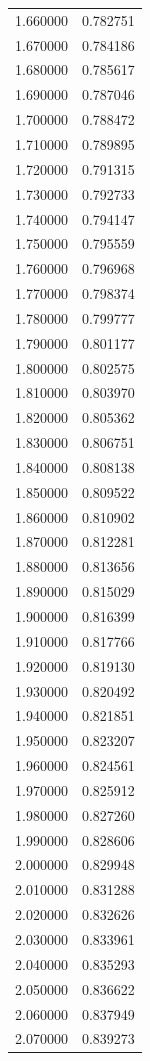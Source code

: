 \begin{tabular}{rr}
1.660000 & 0.782751 \\
1.670000 & 0.784186 \\
1.680000 & 0.785617 \\
1.690000 & 0.787046 \\
1.700000 & 0.788472 \\
1.710000 & 0.789895 \\
1.720000 & 0.791315 \\
1.730000 & 0.792733 \\
1.740000 & 0.794147 \\
1.750000 & 0.795559 \\
1.760000 & 0.796968 \\
1.770000 & 0.798374 \\
1.780000 & 0.799777 \\
1.790000 & 0.801177 \\
1.800000 & 0.802575 \\
1.810000 & 0.803970 \\
1.820000 & 0.805362 \\
1.830000 & 0.806751 \\
1.840000 & 0.808138 \\
1.850000 & 0.809522 \\
1.860000 & 0.810902 \\
1.870000 & 0.812281 \\
1.880000 & 0.813656 \\
1.890000 & 0.815029 \\
1.900000 & 0.816399 \\
1.910000 & 0.817766 \\
1.920000 & 0.819130 \\
1.930000 & 0.820492 \\
1.940000 & 0.821851 \\
1.950000 & 0.823207 \\
1.960000 & 0.824561 \\
1.970000 & 0.825912 \\
1.980000 & 0.827260 \\
1.990000 & 0.828606 \\
2.000000 & 0.829948 \\
2.010000 & 0.831288 \\
2.020000 & 0.832626 \\
2.030000 & 0.833961 \\
2.040000 & 0.835293 \\
2.050000 & 0.836622 \\
2.060000 & 0.837949 \\
2.070000 & 0.839273 \\

\end{tabular}
